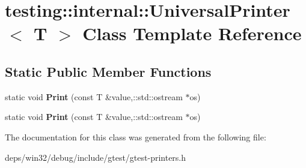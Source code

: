 \hypertarget{classtesting_1_1internal_1_1_universal_printer}{}\section{testing\+:\+:internal\+:\+:Universal\+Printer$<$ T $>$ Class Template Reference}
\label{classtesting_1_1internal_1_1_universal_printer}
\subsection*{Static Public Member Functions}
\begin{DoxyCompactItemize}
\item 
\hypertarget{classtesting_1_1internal_1_1_universal_printer_a6a7d29444412467c14931bc55a046138}{}static void {\bfseries Print} (const T \&value,\+::std\+::ostream $\ast$os)\label{classtesting_1_1internal_1_1_universal_printer_a6a7d29444412467c14931bc55a046138}

\item 
\hypertarget{classtesting_1_1internal_1_1_universal_printer_a6a7d29444412467c14931bc55a046138}{}static void {\bfseries Print} (const T \&value,\+::std\+::ostream $\ast$os)\label{classtesting_1_1internal_1_1_universal_printer_a6a7d29444412467c14931bc55a046138}

\end{DoxyCompactItemize}


The documentation for this class was generated from the following file\+:\begin{DoxyCompactItemize}
\item 
deps/win32/debug/include/gtest/gtest-\/printers.\+h\end{DoxyCompactItemize}

